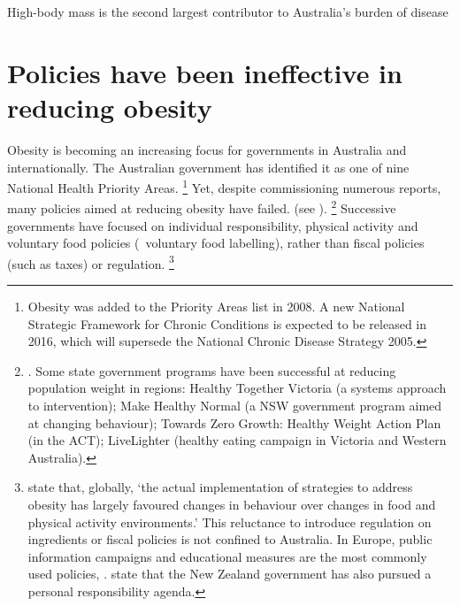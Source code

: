 \documentclass[embargoed]{grattan}
\begin{document}
\begin{table}
\caption{High-body mass is the second largest contributor to Australia's burden of disease} \label{tbl:high-body-is-the-2nd-largest-contributor-to-Aust-disease-burden}




\end{table}

\section{Policies have been ineffective in reducing obesity}\label{policies-have-been-ineffective-in-reducing-obesity}

Obesity is becoming an increasing focus for governments in Australia and internationally.
The Australian government has identified it as one of nine National Health Priority Areas.%
\footnote{Obesity was added to the Priority Areas list in 2008.
A new National Strategic Framework for Chronic Conditions is expected to be released in 2016, which will supersede the National Chronic Disease Strategy 2005.} Yet, despite commissioning numerous reports, many policies aimed at reducing obesity have failed. (see ).%
\footnote{\textcite{Swinburn2013Progressobesityprevention}.
Some state government programs have been successful at reducing population weight in regions: Healthy Together Victoria (a systems approach to intervention); Make Healthy Normal (a NSW government program aimed at changing behaviour); Towards Zero Growth: Healthy Weight Action Plan (in the ACT); LiveLighter (healthy eating campaign in Victoria and Western Australia).} Successive governments have focused on individual responsibility, physical activity and voluntary food policies (\eg~voluntary food labelling), rather than fiscal policies (such as taxes) or regulation.%
\footnote{\textcite{Roberto2015Patchyprogressobesity} state that, globally, `the actual implementation of strategies to address obesity has largely favoured changes in behaviour over changes in food and physical activity environments.' This reluctance to introduce regulation on ingredients or fiscal policies is not confined to Australia.
In Europe, public information campaigns and educational measures are the most commonly used policies, \textcite{Capacci2012Policiespromotehealthy}. \textcite{Swinburn2013Progressobesityprevention} state that the New Zealand government has also pursued a personal responsibility agenda.}
\end{document}
